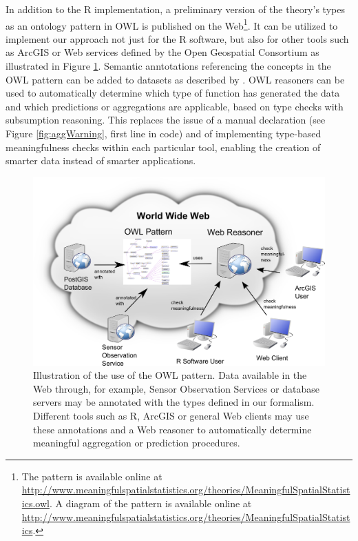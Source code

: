 \documentclass[final,authoryear,1p,times]{elsarticle}
\begin{document}
In addition to the R implementation, a preliminary version of the theory's types as an ontology pattern in OWL is published on the Web\footnote{The pattern is available online at \url{http://www.meaningfulspatialstatistics.org/theories/MeaningfulSpatialStatistics.owl}. A diagram of the pattern is available online at \url{http://www.meaningfulspatialstatistics.org/theories/MeaningfulSpatialStatistics}.}. It can be utilized to implement our approach not just for the R software, but also for other tools such as ArcGIS or Web services defined by the Open Geospatial Consortium as illustrated in Figure \ref{fig:owlPattern}. Semantic anntotations referencing the concepts in the OWL pattern can be added to datasets as described by \cite{Janowicz2010}. OWL reasoners can be used to automatically determine which type of function has generated the data and which predictions or aggregations are applicable, based on type checks with subsumption reasoning. This replaces the issue of a manual declaration (see Figure \ref{fig:aggWarning}, first line in code) and of implementing type-based meaningfulness checks within each particular tool, enabling the creation of smarter data instead of smarter applications.

\begin{figure}[ht]
	\centering
		\includegraphics[scale=0.7]{owlPatternApp.png}
	\caption{Illustration of the use of the OWL pattern. Data available in the Web through, for example, Sensor Observation Services or database servers may be annotated with the types defined in our formalism. Different tools such as R, ArcGIS or general Web clients may use these annotations and a Web reasoner to automatically determine meaningful aggregation or prediction procedures.}
	\label{fig:owlPattern}
\end{figure}
\end{document}
